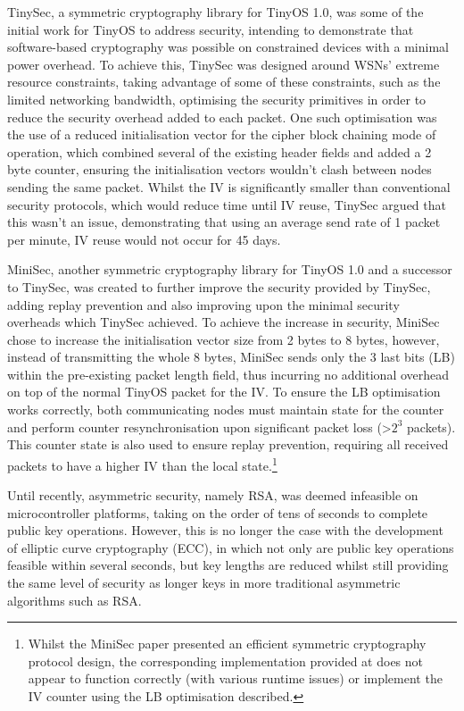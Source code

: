 \documentclass[conference]{./sty/IEEEtran}
\begin{document}
TinySec\cite{TinySec}, a symmetric cryptography library for TinyOS 1.0, was some of the initial work for TinyOS to address security, intending to demonstrate that software-based cryptography was possible on constrained devices with a minimal power overhead. To achieve this, TinySec was designed around WSNs' extreme resource constraints, taking advantage of some of these constraints, such as the limited networking bandwidth, optimising the security primitives in order to reduce the security overhead added to each packet. One such optimisation was the use of a reduced initialisation vector for the cipher block chaining mode of operation, which combined several of the existing header fields and added a 2 byte counter, ensuring the initialisation vectors wouldn't clash between nodes sending the same packet. Whilst the IV is significantly smaller than conventional security protocols, which would reduce time until IV reuse, TinySec argued that this wasn't an issue, demonstrating that using an average send rate of 1 packet per minute, IV reuse would not occur for 45 days.

MiniSec, another symmetric cryptography library for TinyOS 1.0 and a successor to TinySec, was created to further improve the security provided by TinySec, adding replay prevention and also improving upon the minimal security overheads which TinySec achieved. To achieve the increase in security, MiniSec chose to increase the initialisation vector size from 2 bytes to 8 bytes, however, instead of transmitting the whole 8 bytes, MiniSec sends only the 3 last bits (LB) within the pre-existing packet length field, thus incurring no additional overhead on top of the normal TinyOS packet for the IV. To ensure the LB optimisation works correctly, both communicating nodes must maintain state for the counter and perform counter resynchronisation upon significant packet loss (\textgreater$2^3$ packets). This counter state is also used to ensure replay prevention, requiring all received packets to have a higher IV than the local state.\footnote{Whilst the MiniSec paper presented an efficient symmetric cryptography protocol design, the corresponding implementation provided at \cite{MiniSecLink} does not appear to function correctly (with various runtime issues) or implement the IV counter using the LB optimisation described.}

Until recently, asymmetric security, namely RSA, was deemed infeasible on microcontroller platforms, taking on the order of tens of seconds to complete public key operations\cite{TinyECC}. However, this is no longer the case with the development of elliptic curve cryptography (ECC), in which not only are public key operations feasible within several seconds, but key lengths are reduced whilst still providing the same level of security as longer keys in more traditional asymmetric algorithms such as RSA. 
\end{document}
